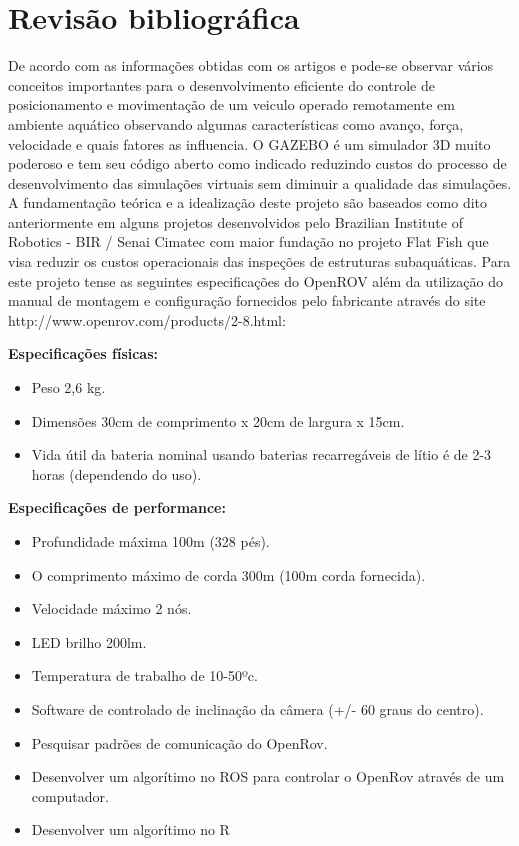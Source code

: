 \setcounter{equation}{0}
\chapter{Revisão bibliográfica}
De acordo com as informações obtidas com os artigos \cite{2} e \cite{3} pode-se observar vários conceitos importantes para o desenvolvimento eficiente do controle de posicionamento e movimentação de um veiculo operado remotamente em ambiente aquático observando algumas características como avanço, força, velocidade e quais fatores as influencia. 
O GAZEBO é um simulador 3D muito poderoso e tem seu código aberto como indicado \cite{4} reduzindo custos do processo de desenvolvimento das simulações virtuais sem diminuir a qualidade das simulações. 
A fundamentação teórica e a idealização deste projeto são baseados como dito anteriormente em alguns projetos desenvolvidos pelo Brazilian Institute of Robotics - BIR / Senai Cimatec com maior fundação no projeto Flat Fish que visa reduzir os custos operacionais das inspeções de estruturas subaquáticas.\cite{5}
Para este projeto tense as seguintes especificações do OpenROV além da utilização do manual de montagem e configuração fornecidos pelo fabricante através do site http://www.openrov.com/products/2-8.html:

\textbf{\large Especificações físicas:}
 
\begin{itemize}

	\item Peso 2,6 kg.
	\item Dimensões 30cm de comprimento x 20cm de largura x 15cm.
	\item Vida útil da bateria nominal usando baterias recarregáveis de lítio é de 2-3 horas (dependendo do uso).
	
\end{itemize}

\textbf{\large Especificações de performance:}
 
\begin{itemize}

	\item Profundidade máxima 100m (328 pés).
	\item O comprimento máximo de corda 300m (100m corda fornecida).
	\item Velocidade máximo 2 nós.
	\item LED brilho 200lm.
	\item Temperatura de trabalho de 10-50ºc.
	\item Software de controlado de inclinação da câmera (+/- 60 graus do centro).
	\item Pesquisar padrões de comunicação do OpenRov.
	\item Desenvolver um algorítimo no ROS para controlar o OpenRov através de um computador.
	\item Desenvolver um algorítimo no R
	
\end{itemize}



